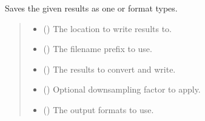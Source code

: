 \documentclass[letterpaper,10pt,english]{sphinxmanual}
\begin{document}
\begin{fulllineitems}
\label{\detokenize{modules/output/formats:qnav.output.formats.save_as}}
\pysigstartsignatures
{}
\pysigstopsignatures
\sphinxAtStartPar
Saves the given results as one or format types.
\begin{quote}\begin{description}
\begin{itemize}
\item {} 
\sphinxAtStartPar
{} () \textendash{} The location to write results to.

\item {} 
\sphinxAtStartPar
{} () \textendash{} The filename prefix to use.

\item {} 
\sphinxAtStartPar
{} ({\hyperref[\detokenize{modules/output/data:qnav.output.data.ResultsTable}]{}}) \textendash{} The results to convert and write.

\item {} 
\sphinxAtStartPar
{} () \textendash{} Optional down\sphinxhyphen{}sampling factor to apply.

\item {} 
\sphinxAtStartPar
{} ({\hyperref[\detokenize{modules/output/formats:qnav.output.formats.SaveFormat}]{}}) \textendash{} The output formats to use.

\end{itemize}

\end{description}\end{quote}

\end{fulllineitems}
\end{document}
